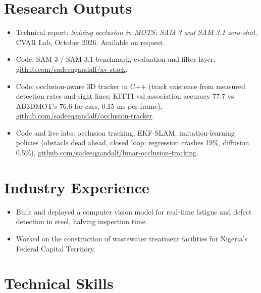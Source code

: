 \documentclass[10pt,letterpaper]{article}
\begin{document}
\section{Research Outputs}
\begin{itemize}
  \item Technical report: \emph{Solving occlusion in MOTS: SAM 3 and SAM 3.1 zero-shot}, CVAR Lab, October 2026. Available on request.
  \item Code: SAM 3 / SAM 3.1 benchmark, evaluation and filter layer, \href{https://github.com/sadeeqgandalf/av-stack}{github.com/sadeeqgandalf/av-stack}.
  \item Code: occlusion-aware 3D tracker in C++ (track existence from measured detection rates and sight lines; KITTI val association
        accuracy 77.7 vs AB3DMOT's 76.6 for cars, 0.15 ms per frame), \href{https://github.com/sadeeqgandalf/occlusion-tracker}{github.com/sadeeqgandalf/occlusion-tracker}.
  \item Code and live labs: occlusion tracking, EKF-SLAM, imitation-learning policies (obstacle dead ahead, closed loop: regression
        crashes 19\%, diffusion 0.5\%), \href{https://github.com/sadeeqgandalf/lunar-occlusion-tracking}{github.com/sadeeqgandalf/lunar-occlusion-tracking}.
\end{itemize}

\section{Industry Experience}
\begin{itemize}
  \item Built and deployed a computer vision model for real-time fatigue and defect detection in steel, halving inspection time.
\end{itemize}
\begin{itemize}
  \item Worked on the construction of wastewater treatment facilities for Nigeria's Federal Capital Territory.
\end{itemize}

\section{Technical Skills}
\end{document}
